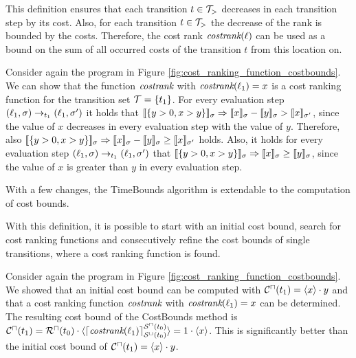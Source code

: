 This definition ensures that each transition $t \in \mathcal{T}_>$ decreases in each transition step by its cost.
Also, for each transition $t \in \mathcal{T}_>$ the decrease of the rank is bounded by the costs.
Therefore, the cost rank $\emph{costrank}(\ell)$ can be used as a bound on the sum of all occurred costs of the transition $t$ from this location on.

\begin{example}
  Consider again the program in Figure \ref{fig:cost_ranking_function_costbounds}.
  We can show that the function $\emph{costrank}$ with $\emph{costrank}(\ell_1) = x$ is a cost ranking function for the transition set $\mathcal{T} = \lbrace t_1 \rbrace$.
  For every evaluation step $(\ell_1,\sigma) \rightarrow_{t_1} (\ell_1,\sigma')$ it holds that $\llbracket \lbrace y > 0, x > y \rbrace \rrbracket_{\sigma} \Rightarrow \llbracket x \rrbracket_{\sigma} - \llbracket y \rrbracket_{\sigma} > \llbracket x \rrbracket_{\sigma'}$, since the value of $x$ decreases in every evaluation step with the value of $y$.
  Therefore, also $\llbracket \lbrace y > 0, x > y \rbrace \rrbracket_{\sigma} \Rightarrow \llbracket x \rrbracket_{\sigma} - \llbracket y \rrbracket_{\sigma} \geq \llbracket x \rrbracket_{\sigma'}$ holds.
  Also, it holds for every evaluation step $(\ell_1,\sigma) \rightarrow_{t_1} (\ell_1,\sigma')$ that $\llbracket \lbrace y > 0, x > y \rbrace \rrbracket_{\sigma} \Rightarrow \llbracket x \rrbracket_{\sigma} \geq \llbracket y \rrbracket_{\sigma}$, since the value of $x$ is greater than $y$ in every evaluation step.
\end{example}

With a few changes, the TimeBounds algorithm is extendable to the computation of cost bounds.



With this definition, it is possible to start with an initial cost bound, search for cost ranking functions and consecutively refine the cost bounds of single transitions, where a cost ranking function is found.

\begin{example}
  Consider again the program in Figure \ref{fig:cost_ranking_function_costbounds}.
  We showed that an initial cost bound can be computed with ${\mathcal{C}^\sqcap}(t_1) = \langle x\rangle \cdot y$ and that a cost ranking function $\emph{costrank}$ with $\emph{costrank}(\ell_1) = x$ can be determined.
  The resulting cost bound of the CostBounds method is ${\mathcal{C}^\sqcap}(t_1) = {\mathcal{R}^\sqcap}(t_0) \cdot \langle\lceil \emph{costrank}(\ell_1) \rceil^{{\mathcal{S}^\sqcap}(t_0)}_{{\mathcal{S}^\sqcup}(t_0)}\rangle = 1 \cdot \langle x\rangle$.
  This is significantly better than the initial cost bound of ${\mathcal{C}^\sqcap}(t_1) = \langle x\rangle \cdot y$.
\end{example}

